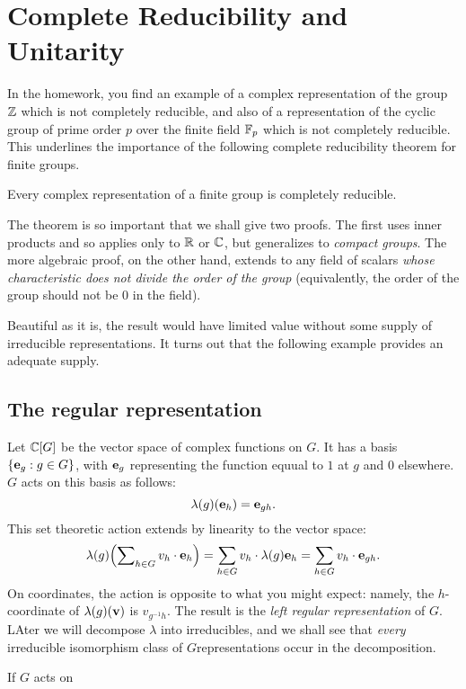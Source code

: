 \chapter{Complete Reducibility and Unitarity}
In the homework, you find an example of a complex representation of the
group \(\mathbb{Z}\) which is not completely reducible, and also of a
representation of the cyclic group of prime order \(p\) over the finite
field \(\mathbb{F}_p\) which is not completely reducible. This underlines the
importance of the following complete reducibility theorem for finite
groups.

\begin{theorem}
  Every complex representation of a finite group is completely reducible.
\end{theorem}

The theorem is so important that we shall give two proofs. The first uses
inner products and so applies only to \(\mathbb{R}\) or \(\mathbb{C}\), but generalizes
to \emph{compact groups}. The more algebraic proof, on the other hand,
extends to any field of scalars \emph{whose characteristic does not divide
  the order of the group} (equivalently, the order of the group should not
be \(0\) in the field).

Beautiful as it is, the result would have limited value without some supply
of irreducible representations. It turns out that the following example
provides an adequate supply.

\section{The regular representation}
Let \(\mathbb{C}[G]\) be the vector space of complex functions on \(G\). It has a
basis \(\{\mathbf{e}_g:g\in G\}\), with \(\mathbf{e}_g\) representing the function
equual to \(1\) at \(g\) and \(0\) elsewhere. \(G\) acts on this basis as
follows:
\[
  \lambda(g)(\mathbf{e}_h)=\mathbf{e}_{gh}.
\]
This set theoretic action extends by linearity to the vector space:
\[
  \lambda(g)\Bigl(\sum\nolimits_{h\in G} v_h\cdot\mathbf{e}_h\Bigr)
  =\sum_{h\in G}v_h\cdot\lambda(g)\mathbf{e}_h
  =\sum_{h\in G}v_h\cdot\mathbf{e}_{gh}.
\]
On coordinates, the action is opposite to what you might expect: namely,
the \(h\)-coordinate of \(\lambda(g)(\mathbf{v})\) is \(v_{g^{-1}h}\). The result
is the \emph{left regular representation} of \(G\). LAter we will decompose
\(\lambda\) into irreducibles, and we shall see that \emph{every}
irreducible isomorphism class of \(G\)representations occur in the
decomposition.

\begin{remark}
  If \(G\) acts on
\end{remark}

